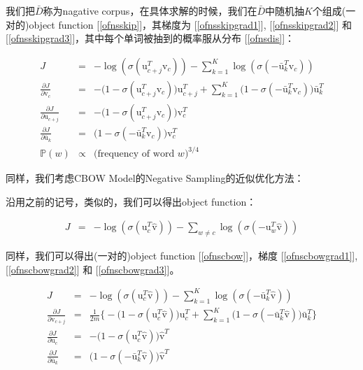 \documentclass{article}
\begin{document}
我们把$\bar{D}$称为nagative corpus，在具体求解的时候，我们在$\bar{D}$中随机抽$K$个组成(一对的)object function [\ref{ofnsskip}]，其梯度为 [\ref{ofnsskipgrad1}], [\ref{ofnsskipgrad2}] 和 [\ref{ofnsskipgrad3}]，其中每个单词被抽到的概率服从分布 [\ref{ofnsdis}]：

\begin{eqnarray}
\label{ofnsskip}
J &=& -\log(\sigma(\mathrm{u}_{c+j}^T\mathrm{v}_c)) - \sum_{k=1}^K{\log(\sigma(-\bar{\mathrm{u}}_k^T\mathrm{v}_c))}\\
\label{ofnsskipgrad1}
\frac{\partial J}{\partial \mathrm{v}_c} &=& -\big(1-\sigma(\mathrm{u}_{c+j}^T\mathrm{v}_c)\big)\mathrm{u}_{c+j}^T + \sum_{k=1}^K{\big(1-\sigma(-\bar{\mathrm{u}}_k^T\mathrm{v}_c)\big)\bar{\mathrm{u}}_k^T} \\
\label{ofnsskipgrad2}
\frac{\partial J}{\partial \mathrm{u}_{c+j}} &=& -\big(1-\sigma(\mathrm{u}_{c+j}^T\mathrm{v}_c)\big)\mathrm{v}_{c}^T \\
\label{ofnsskipgrad3}
\frac{\partial J}{\partial \bar{\mathrm{u}}_k} &=& \big(1-\sigma(-\bar{\mathrm{u}}_k^T\mathrm{v}_c)\big)\mathrm{v}_{c}^T \\
\label{ofnsdis}
\mathbb{P}(w) &\propto& \big(\text{frequency of word $w$}\big)^{3/4}
\end{eqnarray}

同样，我们考虑CBOW Model的Negative Sampling的近似优化方法：

沿用之前的记号，类似的，我们可以得出object function：

\begin{eqnarray}
J &=& -\log(\sigma(\mathrm{u}_c^T\hat{\mathrm{v}})) - \sum_{w \neq c}{\log(\sigma(-\mathrm{u}_w^T\hat{\mathrm{v}}))}
\end{eqnarray}

同样，我们可以得出(一对的)object function [\ref{ofnscbow}]，梯度 [\ref{ofnscbowgrad1}], [\ref{ofnscbowgrad2}] 和 [\ref{ofnscbowgrad3}]。

\begin{eqnarray}
\label{ofnscbow}
J &=& -\log(\sigma(\mathrm{u}_c^T\hat{\mathrm{v}})) - \sum_{k=1}^K{\log(\sigma(-\bar{\mathrm{u}}_k^T\hat{\mathrm{v}}))}\\
\label{ofnscbowgrad1}
\frac{\partial J}{\partial \mathrm{v}_{c+j}} &=& \frac{1}{2m}\Big\{-\big(1-\sigma(\mathrm{u}_{c}^T\hat{\mathrm{v}})\big)\mathrm{u}_{c}^T + \sum_{k=1}^K{\big(1-\sigma(-\bar{\mathrm{u}}_k^T\hat{\mathrm{v}})\big)\bar{\mathrm{u}}_k^T}\Big\} \\
\label{ofnscbowgrad2}
\frac{\partial J}{\partial \mathrm{u}_{c}} &=& -\big(1-\sigma(\mathrm{u}_{c}^T\hat{\mathrm{v}})\big)\hat{\mathrm{v}}^T \\
\label{ofnscbowgrad3}
\frac{\partial J}{\partial \bar{\mathrm{u}}_k} &=& \big(1-\sigma(-\bar{\mathrm{u}}_k^T\hat{\mathrm{v}})\big)\hat{\mathrm{v}}^T \\
\end{eqnarray}
\end{document}

